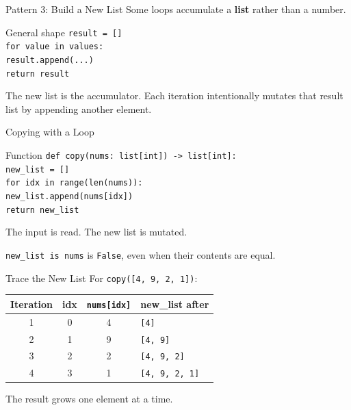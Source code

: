 \documentclass[aspectratio=169,10pt]{beamer}
\begin{document}

\begin{frame}{Pattern 3: Build a New List}
  Some loops accumulate a \textbf{list} rather than a number.

  \begin{block}{General shape}
    \texttt{result = []}\\
    \texttt{for value in values:}\\
    \hspace{0.20in}\texttt{result.append(...)}\\
    \texttt{return result}
  \end{block}

  \begin{keyidea}
    The new list is the accumulator. Each iteration intentionally mutates that result list by appending another element.
  \end{keyidea}
\end{frame}

\begin{frame}{Copying with a Loop}
  \begin{block}{Function}
    \texttt{def copy(nums: list[int]) -> list[int]:}\\
    \hspace{0.20in}\texttt{new\_list = []}\\
    \hspace{0.20in}\texttt{for idx in range(len(nums)):}\\
    \hspace{0.40in}\texttt{new\_list.append(nums[idx])}\\
    \hspace{0.20in}\texttt{return new\_list}
  \end{block}

  The input is read. The new list is mutated.

  \begin{center}
    \texttt{new\_list is nums} is \texttt{False}, even when their contents are equal.
  \end{center}
\end{frame}

\begin{frame}{Trace the New List}
  For \texttt{copy([4, 9, 2, 1])}:

  \begin{center}
    \renewcommand{\arraystretch}{1.22}
    \begin{tabular}{c|c|c|l}
      \textbf{Iteration} & \textbf{idx} & \textbf{\texttt{nums[idx]}} & \textbf{new\_list after} \\\hline
      1 & 0 & 4 & \texttt{[4]} \\
      2 & 1 & 9 & \texttt{[4, 9]} \\
      3 & 2 & 2 & \texttt{[4, 9, 2]} \\
      4 & 3 & 1 & \texttt{[4, 9, 2, 1]}
    \end{tabular}
  \end{center}

  The result grows one element at a time.
\end{frame}
\end{document}
